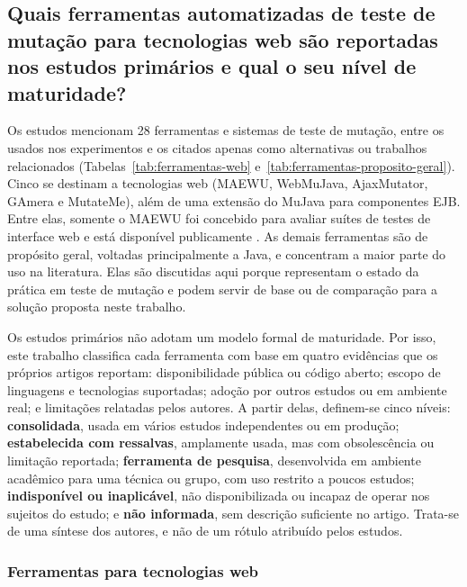 \subsection[Quais ferramentas são mais utilizadas na literatura?]{Quais ferramentas automatizadas de teste de mutação para tecnologias web são reportadas nos estudos primários e qual o seu nível de maturidade?}
\label{subsec:ferramentas-utilizadas}

Os estudos mencionam 28 ferramentas e sistemas de teste de mutação, entre os usados nos experimentos e os citados apenas como alternativas ou trabalhos relacionados (Tabelas~\ref{tab:ferramentas-web} e~\ref{tab:ferramentas-proposito-geral}). Cinco se destinam a tecnologias web (MAEWU, WebMuJava, AjaxMutator, GAmera e MutateMe), além de uma extensão do MuJava para componentes EJB. Entre elas, somente o MAEWU foi concebido para avaliar suítes de testes de interface web e está disponível publicamente \cite{yandrapally2021}. As demais ferramentas são de propósito geral, voltadas principalmente a Java, e concentram a maior parte do uso na literatura. Elas são discutidas aqui porque representam o estado da prática em teste de mutação e podem servir de base ou de comparação para a solução proposta neste trabalho.

Os estudos primários não adotam um modelo formal de maturidade. Por isso, este trabalho classifica cada ferramenta com base em quatro evidências que os próprios artigos reportam: disponibilidade pública ou código aberto; escopo de linguagens e tecnologias suportadas; adoção por outros estudos ou em ambiente real; e limitações relatadas pelos autores. A partir delas, definem-se cinco níveis: \textbf{consolidada}, usada em vários estudos independentes ou em produção; \textbf{estabelecida com ressalvas}, amplamente usada, mas com obsolescência ou limitação reportada; \textbf{ferramenta de pesquisa}, desenvolvida em ambiente acadêmico para uma técnica ou grupo, com uso restrito a poucos estudos; \textbf{indisponível ou inaplicável}, não disponibilizada ou incapaz de operar nos sujeitos do estudo; e \textbf{não informada}, sem descrição suficiente no artigo. Trata-se de uma síntese dos autores, e não de um rótulo atribuído pelos estudos.

\subsubsection{Ferramentas para tecnologias web}

